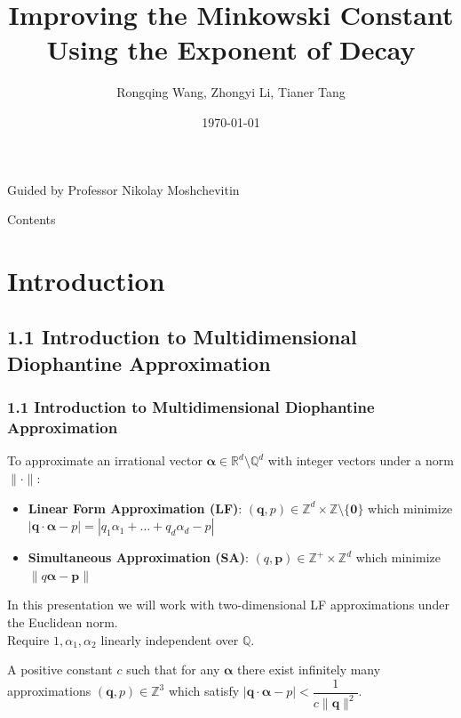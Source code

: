 \documentclass[aspectratio=1610]{beamer}
\title{Improving the Minkowski Constant Using the Exponent of Decay}\author{Rongqing Wang, Zhongyi Li, Tianer Tang}
\date\today
\begin{document}
\begin{frame}[plain]
    \titlepage
    \vfill
    \centering
    \small Guided by Professor Nikolay Moshchevitin
\end{frame}
\begin{frame}{Contents}\tableofcontents\end{frame}

\section{Introduction}
\subsection{1.1 Introduction to Multidimensional Diophantine Approximation}
\begin{frame}
    \frametitle{1.1 Introduction to Multidimensional Diophantine Approximation}
    To approximate an irrational vector $\boldsymbol{\alpha} \in \mathbb{R}^d \setminus \mathbb{Q}^d$ with integer vectors under a norm $\|\cdot\|$:
    \begin{itemize}        
        \item \textbf{Linear Form Approximation (LF)}: $(\mathbf{q},p) \in \mathbb{Z}^d \times \mathbb{Z} \setminus      \{\textbf{0}\}$ which minimize $| \mathbf{q} \cdot \boldsymbol{\alpha} - p | = |q_1\alpha_1 + \dots + q_d\alpha_d - p|$
        \item \textbf{Simultaneous Approximation (SA)}: $(q,\mathbf{p}) \in \mathbb{Z}^+ \times \mathbb{Z}^d$ 
            which minimize $ \|q\boldsymbol{\alpha} - \mathbf{p}\|$
    \end{itemize}

    In this presentation we will work with two-dimensional LF approximations under the Euclidean norm.\vspace{0.6cm}\\
    Require $1, \alpha_1, \alpha_2$ linearly independent over $\mathbb{Q}$.

        \begin{definition}
        A positive constant $c$ such that for any $\boldsymbol{\alpha}$ there exist infinitely many approximations $(\mathbf{q},p) \in \mathbb{Z}^3$ which satisfy $| \mathbf{q} \cdot \boldsymbol{\alpha} - p | < \dfrac{1}{c\|\textbf{q}\|^2}$.
    \end{definition}
\end{frame}
\end{document}
